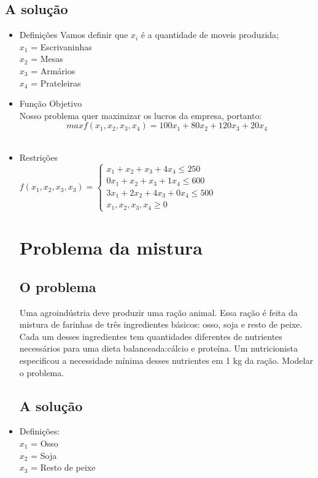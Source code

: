 \documentclass[a4paper]{article}
\begin{document}
\subsection{A solu\c{c}\~ao}
\begin{itemize}
\item Defini\c{c}\~oes
Vamos definir que $x_i$ \'e a quantidade de moveis produzida;
\\
$x_1$ = Escrivaninhas
\\
$x_2$ = Mesas 
\\
$x_3$ = Arm\'arios
\\
$x_4$ = Prateleiras
\\
\item Fun\c{c}\~ao Objetivo
\\
Nosso problema quer maximizar os lucros da empresa, portanto:
\\
\begin{equation}
max f(x_1,x_2,x_3,x_4) = 100x_1 + 80x_2 +120 x_3 + 20 x_4
\end{equation}
\\
\item Restri\c{c}\~oes
\\
$f(x_1,x_2,x_3,x_3) = 
\left \{
\begin{array}{ll}
x_1 + x_2 + x_3 +4x_4 \leq 250 \\ 
0x_1 + x_2 + x_3 +1x_4  \leq 600\\ 
3x_1 + 2x_2 + 4x_3 +0x_4  \leq 500\\ 
x_1,x_2,x_3, x_4 \geq 0
\end{array}$
\section{Problema da mistura}
\subsection{O problema}
Uma agroind\'ustria deve produzir uma ra\c{c}\~ao animal. Essa ra\c{c}\~ao \'e feita da mistura de farinhas de tr\^es ingredientes b\'asicos: osso, soja e resto de peixe. Cada um desses ingredientes tem quantidades diferentes de nutrientes necess\'arios para uma dieta balanceada:c\'alcio e prote\'ina. Um nutricionista especificou a necessidade m\'inima desses nutrientes em 1 kg da ra\c{c}\~ao. Modelar o problema.
\\
\subsection {A solu\c{c}\~ao}
\item Defini\c{c}\~oes:
\\
$x_1$ = Osso 
\\
$x_2$ = Soja 
\\
$x_3$ = Resto de peixe 
\\


\end{itemize}
\end{document}
